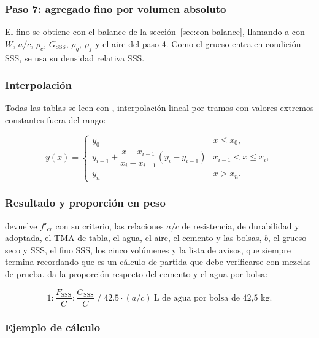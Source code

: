 \subsubsection{Paso 7: agregado fino por volumen absoluto}

El fino se obtiene con el balance de la sección~\ref{sec:con-balance}, llamando a
 con $W$, $a/c$, $\rho_c$, $G_{\text{SSS}}$, $\rho_g$, $\rho_f$ y el
aire del paso 4. Como el grueso entra en condición SSS, se usa su densidad relativa SSS.

\subsubsection{Interpolación}

Todas las tablas se leen con , interpolación lineal por tramos con valores extremos
constantes fuera del rango:

\begin{equation}
	y(x) =
	\begin{cases}
		y_0 & x \le x_0,\\
		y_{i-1} + \dfrac{x - x_{i-1}}{x_i - x_{i-1}} \left(y_i - y_{i-1}\right) & x_{i-1} < x \le x_i,\\
		y_{n} & x > x_n.
	\end{cases}
\end{equation}

\subsubsection{Resultado y proporción en peso}

 devuelve $f'_{cr}$ con su criterio, las relaciones $a/c$ de resistencia, de durabilidad y adoptada, el
TMA de tabla, el agua, el aire, el cemento y las bolsas, $b$, el grueso seco y SSS, el fino SSS, los cinco volúmenes y
la lista de avisos, que siempre termina recordando que es un cálculo de partida que debe verificarse con mezclas de
prueba.  da la proporción respecto del cemento y el agua por bolsa:

\begin{equation}
	1 : \frac{F_{\text{SSS}}}{C} : \frac{G_{\text{SSS}}}{C} \;\big/\; 42.5 \cdot (a/c)\ \text{L de agua por bolsa de 42,5 kg}.
\end{equation}

\subsubsection{Ejemplo de cálculo}

